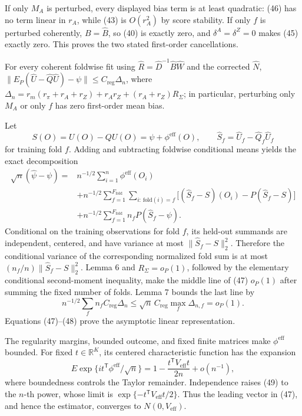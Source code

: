 If only \(M_A\) is perturbed, every displayed bias term is at least quadratic: (46) has no term linear in \(r_A\), while (43) is \(O(r_A^2)\) by score stability.  If only \(f\) is perturbed coherently, \(B=\widehat B\), so (40) is exactly zero, and \(\delta^A=\delta^Z=0\) makes (45) exactly zero.  This proves the two stated first-order cancellations.

For every coherent foldwise fit using \(\widehat R=\widehat D^{-1}\widehat B\widehat W\) and the corrected \(\widehat N\), \(\|E_P(\widehat U-\widehat Q\widehat U)-\psi\|\leq C_{\mathrm{reg}}\Delta_n\), where \(\Delta_n=r_m(r_\pi+r_A+r_Z)+r_Ar_Z+(r_A+r_Z)R_{\Sigma}\); in particular, perturbing only \(M_A\) or only \(f\) has zero first-order mean bias.

Let
\[
S(O)=U(O)-QU(O)=\psi+\phi^{\mathrm{eff}}(O),
\qquad \widehat S_f=\widehat U_f-\widehat Q_f\widehat U_f
\]
for training fold \(f\).  Adding and subtracting foldwise conditional means yields the exact decomposition
\[
\begin{aligned}
\sqrt n(\widehat\psi-\psi)
={}&n^{-1/2}\sum_{i=1}^n\phi^{\mathrm{eff}}(O_i)\\
&+n^{-1/2}\sum_{f=1}^{F_{\mathrm{fold}}}
 \sum_{i:\,\mathrm{fold}(i)=f}
 \bigl[(\widehat S_f-S)(O_i)-P(\widehat S_f-S)\bigr]\\
&+n^{-1/2}\sum_{f=1}^{F_{\mathrm{fold}}}n_fP(\widehat S_f-\psi).
\end{aligned} \tag{47}
\]
Conditional on the training observations for fold \(f\), its held-out summands are independent, centered, and have variance at most \(\|\widehat S_f-S\|_2^2\).  Therefore the conditional variance of the corresponding normalized fold sum is at most \((n_f/n)\|\widehat S_f-S\|_2^2\).  Lemma 6 and \(R_\Sigma=o_P(1)\), followed by the elementary conditional second-moment inequality, make the middle line of (47) \(o_P(1)\) after summing the fixed number of folds.  Lemma 7 bounds the last line by
\[
n^{-1/2}\sum_fn_f C_{\mathrm{reg}}\Delta_n
\leq \sqrt n\,C_{\mathrm{reg}}\max_f\Delta_{n,f}=o_P(1). \tag{48}
\]
Equations (47)--(48) prove the asymptotic linear representation.

The regularity margins, bounded outcome, and fixed finite matrices make \(\phi^{\mathrm{eff}}\) bounded.  For fixed \(t\in\mathbb R^K\), its centered characteristic function has the expansion
\[
E\exp\{it^{\mathsf T}\phi^{\mathrm{eff}}/\sqrt n\}
=1-\frac{t^{\mathsf T}V_{\mathrm{eff}}t}{2n}+o(n^{-1}), \tag{49}
\]
where boundedness controls the Taylor remainder.  Independence raises (49) to the \(n\)-th power, whose limit is
\(\exp\{-t^{\mathsf T}V_{\mathrm{eff}}t/2\}\).  Thus the leading vector in (47), and hence the estimator, converges to \(N(0,V_{\mathrm{eff}})\).

